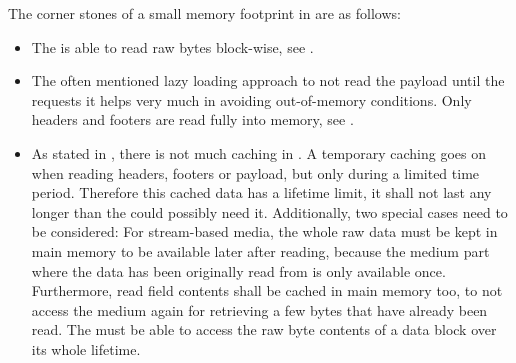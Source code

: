 The corner stones of a small memory footprint in \LibName{} are as follows:
\begin{itemize}
	\item The \ACTORuser{} is able to read raw bytes block-wise, see .
	\item The often mentioned lazy loading approach to not read the payload until the \ACTORuser{} requests it helps very much in avoiding out-of-memory conditions. Only headers and footers are read fully into memory, see .
	\item As stated in , there is not much caching in \LibName{}. A temporary caching goes on when reading headers, footers or payload, but only during a limited time period. Therefore this cached data has a lifetime limit, it shall not last any longer than the \ACTORuser{} could possibly need it. Additionally, two special cases need to be considered: For stream-based media, the whole raw data must be kept in main memory to be available later after reading, because the medium part where the data has been originally read from is only available once. Furthermore, read field contents shall be cached in main memory too, to not access the medium again for retrieving a few bytes that have already been read. The \ACTORuser{} must be able to access the raw byte contents of a data block over its whole lifetime. 
	

\end{itemize}

